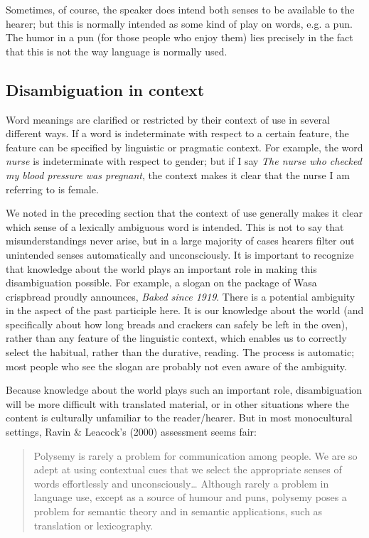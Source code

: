 Sometimes, of course, the speaker does intend both senses to be available to the hearer; but this is normally intended as some kind of play on words, e.g. a pun. The humor in a pun (for those people who enjoy them) lies precisely in the fact that this is not the way language is normally used.


\subsection{Disambiguation in context}\label{sec:5.3.5}

Word meanings are clarified or restricted by their context of use in several different ways. If a word is indeterminate with respect to a certain feature, the feature can be specified by linguistic or pragmatic context. For example, the word \textit{nurse} is indeterminate with respect to gender; but if I say \textit{The nurse who checked my blood pressure was pregnant}, the context makes it clear that the nurse I am referring to is female.



We noted in the preceding section that the context of use generally makes it clear which sense of a lexically ambiguous word is intended. This is not to say that misunderstandings never arise, but in a large majority of cases hearers filter out unintended senses automatically and unconsciously. It is important to recognize that knowledge about the world plays an important role in making this disambiguation possible. For example, a slogan on the package of Wasa crispbread proudly announces, \textit{Baked since 1919}. There is a potential ambiguity in the aspect of the past participle here. It is our knowledge about the world (and specifically about how long breads and crackers can safely be left in the oven), rather than any feature of the linguistic context, which enables us to correctly select the habitual, rather than the durative, reading. The process is automatic; most people who see the slogan are probably not even aware of the ambiguity.



Because knowledge about the world plays such an important role, disambiguation will be more difficult with translated material, or in other situations where the content is culturally unfamiliar to the reader/hearer. But in most monocultural settings, Ravin \& Leacock’s (2000) assessment seems fair:


\begin{quote}
Polysemy is rarely a problem for communication among people. We are so adept at using contextual cues that we select the appropriate senses of words effortlessly and unconsciously… Although rarely a problem in language use, except as a source of humour and puns, polysemy poses a problem for semantic theory and in semantic applications, such as translation or lexicography.
\end{quote}


